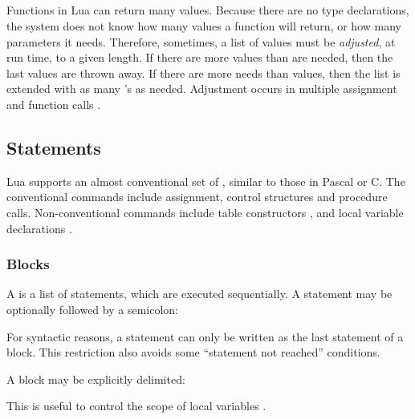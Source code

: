 \subsection{} \label{adjust}

Functions in Lua can return many values.
Because there are no type declarations,
the system does not know how many values a function will return,
or how many parameters it needs.
Therefore, sometimes, a list of values must be \emph{adjusted}, at run time,
to a given length.
If there are more values than are needed,
then the last values are thrown away.
If there are more needs than values,
then the list is extended with as many  \nil's as needed.
Adjustment occurs in multiple assignment 
and function calls .


\subsection{Statements}\label{stats}

Lua supports an almost conventional set of ,
similar to those in Pascal or C.
The conventional commands include
assignment, control structures and procedure calls.
Non-conventional commands include table constructors
,
and local variable declarations .

\subsubsection{Blocks}
A  is a list of statements, which are executed sequentially.
A statement may be optionally followed by a semicolon:
\begin{Produc}
\end{Produc}%
For syntactic reasons, a  statement can only be written
as the last statement of a block.
This restriction also avoids some ``statement not reached'' conditions.

A block may be explicitly delimited:
\begin{Produc}
\end{Produc}%
This is useful to control the scope of local variables .

